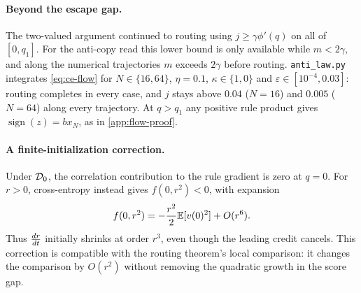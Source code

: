 \paragraph{Beyond the escape gap.}
The two-valued argument continued to routing using $j\ge\gamma\phi'(q)$ on all of $[0,q_1]$.
For the anti-copy read this lower bound is only available while $m<2\gamma$, and along the numerical trajectories $m$ exceeds $2\gamma$ before routing.
\texttt{anti\_law.py} integrates \cref{eq:ce-flow} for $N\in\{16,64\}$, $\eta=0.1$, $\kappa\in\{1,0\}$ and $\varepsilon\in[10^{-4},0.03]$:
routing completes in every case, and $j$ stays above $0.04$ ($N=16$) and $0.005$ ($N=64$) along every trajectory.
At $q>q_1$ any positive rule product gives $\operatorname{sign}(z)=b x_N$, as in \cref{app:flow-proof}.

\paragraph{A finite-initialization correction.}
Under $\mathcal D_{0}$, the correlation contribution to the rule gradient is zero at $q=0$.
For $r>0$, cross-entropy instead gives $f(0,r^2)<0$, with expansion
\[
 f(0,r^2)=-\frac{r^2}{2}\mathbb E[v(0)^2]+O(r^6).
\]
Thus $\frac{d r}{d t}$ initially shrinks at order $r^3$, even though the leading credit cancels.
This correction is compatible with the routing theorem's local comparison: it changes the comparison by $O(r^2)$ without removing the quadratic growth in the score gap.

